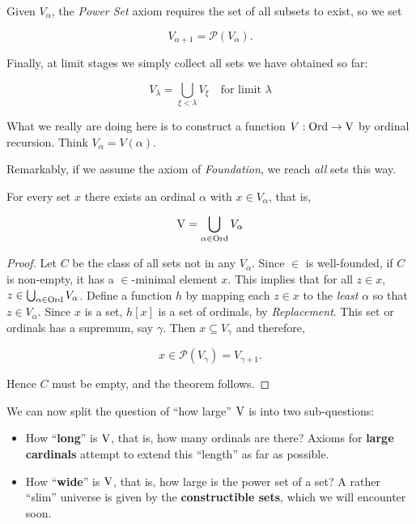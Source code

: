 Given $V_\alpha$, the \textit{Power Set} axiom requires the set of all subsets to exist, so we set

\begin{equation}
V_{\alpha+1} = \mathcal{P}(V_{\alpha}).
\end{equation}

Finally, at limit stages we simply collect all sets we have obtained so far:

\begin{equation}
V_ \lambda =  \bigcup_{\xi < \lambda} V_\xi \quad \text{for limit } \lambda
\end{equation}

What we really are doing here is to construct a function $V: \operatorname{Ord} \to \operatorname{V}$ by ordinal recursion. Think $V_\alpha = V(\alpha)$.

Remarkably, if we assume the axiom of \textit{Foundation}, we reach \textit{all} sets this way.

\begin{theorem}\label{thm-von-neumann}For every set $x$ there exists an ordinal $\alpha$ with $x \in V_\alpha$, that is,

\begin{equation}
\operatorname{V} = \bigcup_{\alpha \in \operatorname{Ord}} V_\alpha
\end{equation}

\end{theorem}\begin{proof}Let $C$ be the class of all sets not in any $V_\alpha$. Since $\in$ is well-founded, if $C$ is non-empty, it has a $\in$-minimal element $x$. This implies that for all $z \in x$, $z \in \bigcup_{\alpha \in \operatorname{Ord}} V_\alpha$. Define a function $h$ by mapping each $z\in x$ to the \textit{least} $\alpha$ so that $z \in V_\alpha$. Since $x$ is a set, $h[x]$ is a set of ordinals, by \textit{Replacement}. This set or ordinals has a supremum, say $\gamma$. Then $x \subseteq V_\gamma$ and therefore,

\begin{equation}
x \in \mathcal{P}(V_\gamma) = V_{\gamma+1}.
\end{equation}

Hence $C$ must be empty, and the theorem follows.

\end{proof}We can now split the question of ``how large'' $\operatorname{V}$ is into two sub-questions:

\begin{itemize}
\item How ``\textbf{long}'' is $\operatorname{V}$, that is, how many ordinals are there? Axioms for \textbf{large cardinals} attempt to extend this ``length'' as far as possible.
\item How ``\textbf{wide}'' is $\operatorname{V}$, that is, how large is the power set of a set? A rather ``slim'' universe is given by the \textbf{constructible sets}, which we will encounter soon.
\end{itemize}